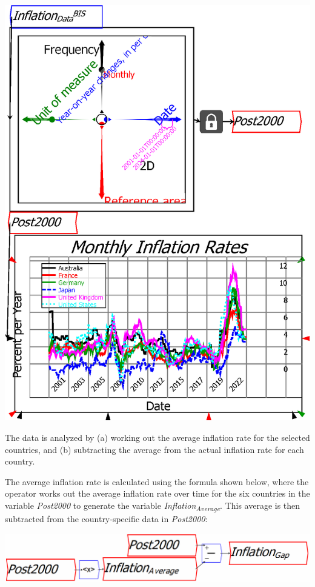 \begin{center}
  \includegraphics{images/02RavelDataInflationGraphed}
\end{center}

The data is analyzed by (a) working out the average inflation rate
for the selected countries, and (b) subtracting the average from the
actual inflation rate for each country.

The average inflation rate is calculated using the formula shown below,
where the operator works out the average
inflation rate over time for the six countries in the variable \emph{Post2000}
to generate the variable \emph{Inflation}\textsubscript{\emph{Average}}.
This average is then subtracted from the country-specific data in
\emph{Post2000}:

\begin{center}
  \includegraphics[width=\textwidth]{images/03Formula}
\end{center}

